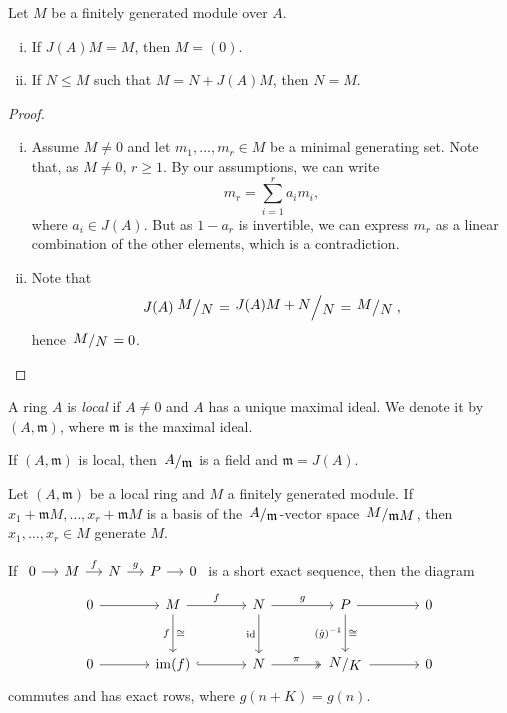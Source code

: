 \begin{lema}[Nakayama]
Let $M$ be a finitely generated module over $A$.

\begin{enumerate}[i)]
\item If $J(A)M = M$, then $M = (0)$.
\item If $N \leq M$ such that $M = N + J(A) M$, then $N = M$.
\end{enumerate}
\end{lema}

\begin{proof}
\phantom{i}
\begin{enumerate}[i)]
\item Assume $M \ne 0$ and let $m_1, \dots, m_r \in M$ be a minimal
generating set. Note that, as $M \ne 0$, $r \geq 1$. By our
assumptions, we can write
\[
m_r = \sum_{i=1}^r a_i m_i,
\]
where $a_i \in J(A)$. But as $1-a_r$ is invertible, we can express
$m_r$ as a linear combination of the other elements, which is a
contradiction.
\item Note that
\[
J(A) \kvoc{M}{N} = \kvoc{J(A) M + N}{N} = \kvoc{M}{N},
\]
hence $\kvoc{M}{N} = 0$. \qedhere
\end{enumerate}
\end{proof}

\begin{definicija}
A ring $A$ is \emph{local} if $A \ne 0$ and $A$
has a unique maximal ideal. We denote it by $(A, \mathfrak{m})$,
where $\mathfrak{m}$ is the maximal ideal.
\end{definicija}

\begin{opomba}
If $(A, \mathfrak{m})$ is local, then $\kvoc{A}{\mathfrak{m}}$ is
a field and $\mathfrak{m} = J(A)$.
\end{opomba}

\begin{posledica}
Let $(A, \mathfrak{m})$ be a local ring and $M$ a finitely
generated module. If
$x_1 + \mathfrak{m} M, \dots, x_r + \mathfrak{m} M$ is a basis of
the $\kvoc{A}{\mathfrak{m}}$-vector space
$\kvoc{M}{\mathfrak{m} M}$, then $x_1, \dots, x_r \in M$ generate
$M$.
\end{posledica}

\begin{trditev}
If
$\begin{tikzcd}[column sep=small]
0 \arrow[r] &
M \arrow[r, "f"] &
N \arrow[r, "g"] &
P \arrow[r] &
0
\end{tikzcd}$
is a short exact sequence, then the diagram
\[
\begin{tikzcd}[row sep=large, column sep=large]
0 \arrow[r] &
M \arrow[r, "f"] \arrow[d, "f"', "\cong"] &
N \arrow[r, "g"] \arrow[d, "\id"'] &
P \arrow[r] \arrow[d, "\br{\hat{g}}^{-1}"', "\cong"] &
0 \\
0 \arrow[r] &
\im(f) \arrow[r, hook] &
N \arrow[r, "\pi", two heads] &
\kvoc{N}{K} \arrow[r] &
0
\end{tikzcd}
\]
commutes and has exact rows, where $\hat{g}(n+K) = g(n)$.
\end{trditev}


